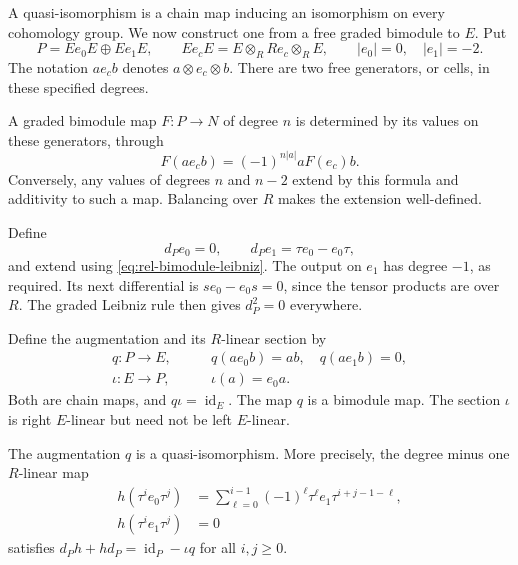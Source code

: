 A quasi-isomorphism is a chain map inducing an isomorphism on every
cohomology group. We now construct one from a free graded bimodule to $E$.
Put
\[
 P=Ee_0E\oplus Ee_1E,
 \qquad Ee_cE=E\otimes_R Re_c\otimes_R E,
 \qquad |e_0|=0,\quad |e_1|=-2.
\]
The notation $ae_cb$ denotes $a\otimes e_c\otimes b$.
There are two free generators, or cells, in these specified degrees.

A graded bimodule map $F:P\to N$ of degree $n$ is determined by its
values on these generators, through
\[
 F(ae_cb)=(-1)^{n|a|}aF(e_c)b.
\]
Conversely, any values of degrees $n$ and $n-2$ extend by this formula
and additivity to such a map. Balancing over $R$ makes the extension
well-defined.

Define
\begin{equation}\label{eq:rel-resolution-differential}
 d_Pe_0=0,\qquad d_Pe_1=\tau e_0-e_0\tau,
\end{equation}
and extend using \eqref{eq:rel-bimodule-leibniz}.
The output on $e_1$ has degree $-1$, as required.
Its next differential is $s e_0-e_0s=0$, since the tensor products are
over $R$. The graded Leibniz rule then gives $d_P^2=0$ everywhere.

Define the augmentation and its $R$-linear section by
\[
 \begin{split}
 q:P\longrightarrow E,&\qquad q(ae_0b)=ab,\quad q(ae_1b)=0,\\
 \iota:E\longrightarrow P,&\qquad \iota(a)=e_0a.
 \end{split}
\]
Both are chain maps, and $q\iota=\operatorname{id}_E$.
The map $q$ is a bimodule map. The section $\iota$ is right $E$-linear
but need not be left $E$-linear.

\begin{proposition}\label{prop:rel-contraction}
The augmentation $q$ is a quasi-isomorphism. More precisely, the degree
minus one $R$-linear map
\begin{equation}\label{eq:rel-contraction}
 \begin{split}
 h(\tau^i e_0\tau^j)
 &=\sum_{\ell=0}^{i-1}(-1)^\ell
       \tau^\ell e_1\tau^{i+j-1-\ell},\\
 h(\tau^i e_1\tau^j)&=0
 \end{split}
\end{equation}
satisfies $d_Ph+hd_P=\operatorname{id}_P-\iota q$ for all $i,j\geq0$.
\end{proposition}

